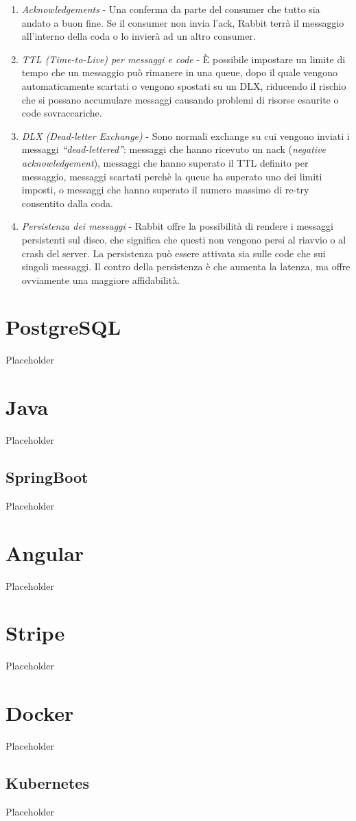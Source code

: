 \begin{itemize}
{      \begin{enumerate}
        \item
          \textit{Acknowledgements} -  Una conferma da parte del consumer che tutto sia andato a buon fine.
          Se il consumer non invia l'ack, Rabbit terr\`a il messaggio all'interno della coda o lo invier\`a ad un altro consumer.
        \item \textit{TTL (Time-to-Live) per messaggi e code} - \`E possibile impostare un limite di tempo che un messaggio pu\`o rimanere
          in una queue, dopo il quale vengono automaticamente scartati o vengono spostati su un DLX, riducendo il rischio che si
          possano accumulare messaggi causando problemi di risorse esaurite o code sovraccariche.
        \item \textit{DLX (Dead-letter Exchange)} - Sono normali exchange su cui vengono inviati i messaggi \textit{``dead-lettered''}: messaggi che hanno
          ricevuto un nack (\textit{negative acknowledgement}), messaggi che hanno superato il TTL definito per messaggio, messaggi
          scartati perch\`e la queue ha superato uno dei limiti imposti, o messaggi che hanno superato il numero massimo di re-try consentito dalla coda.
        \item \textit{Persistenza dei messaggi} -  Rabbit offre la possibilit\`a di rendere i messaggi persistenti sul disco,
          che significa che questi non vengono persi al riavvio o al crash del server. La persistenza pu\`o essere attivata sia sulle code che sui singoli messaggi.
          Il contro della persistenza \`e che aumenta la latenza, ma offre ovviamente una maggiore affidabilit\`a.
      \end{enumerate}
    }
\end{itemize}

\section{PostgreSQL}
Placeholder

\section{Java}
Placeholder
\subsection {SpringBoot}
Placeholder
\section{Angular}
Placeholder
\section{Stripe}
Placeholder
\section{Docker}
Placeholder
\subsection{Kubernetes}
Placeholder
